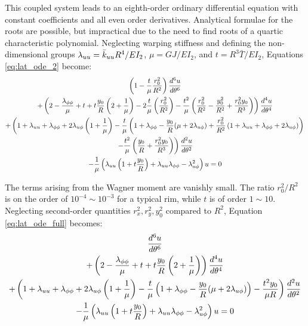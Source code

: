 \documentclass[\rootdir/thesis.tex]{subfiles}
\begin{document}
This coupled system leads to an eighth-order ordinary differential equation with constant coefficients and all even order derivatives. Analytical formulae for the roots are possible, but impractical due to the need to find roots of a quartic characteristic polynomial. Neglecting warping stiffness and defining the non-dimensional groups $\lambda_{uu}=\bar{k}_{uu} R^4/EI_2$, $\mu=GJ/EI_2$, and $t=R^3\bar{T}/EI_2$, Equations \eqref{eq:lat_ode_2} become:
\begin{multline}
\label{eq:lat_ode_full}
  \left(1 - \frac{t}{\mu}\frac{r_0^2}{R^2}\right)\frac{d^6u}{d\theta^6}\\
  +\left(2 - \frac{\lambda_{\phi\phi}}{\mu} + t + t\frac{y_0}{R}\left(2 + \frac{1}{\mu}\right)
         -2\frac{t}{\mu}\left(\frac{r_0^2}{R^2}\right)
         -\frac{t^2}{\mu}\left(\frac{r_0^2}{R^2} - \frac{y_0^2}{R^2} +
                               \frac{r_0^2y_0}{R^3}\right) \right) \frac{d^4u}{d\theta^4}\\
  +\left(1 + \lambda_{uu} + \lambda_{\phi\phi} + 2\lambda_{u\phi}\left(1+\frac{1}{\mu}\right)
         -\frac{t}{\mu}\left(1 + \lambda_{\phi\phi}
                             -\frac{y_0}{R}(\mu + 2\lambda_{u\phi})
                             +\frac{r_0^2}{R^2}\left(1 + \lambda_{uu} + \lambda_{\phi\phi} + 2\lambda_{u\phi}\right)\right)\right.\\
         \left.-\frac{t^2}{\mu}\left(\frac{y_0}{R} + \frac{r_0^2y_0}{R^3}\right)\right)\frac{d^2u}{d\theta^2}\\
  -\frac{1}{\mu}\left(\lambda_{uu}\left(1+t\frac{y_0}{R}\right)
                      +\lambda_{uu}\lambda_{\phi\phi} - \lambda_{u\phi}^2\right)u = 0
\end{multline}

The terms arising from the Wagner moment are vanishly small. The ratio $r_0^2/R^2$ is on the order of $10^{-4}\sim10^{-3}$ for a typical rim, while $t$ is of order $1\sim10$. Neglecting second-order quantities $r_x^2,r_y^2,y_0^2$ compared to $R^2$, Equation \eqref{eq:lat_ode_full} becomes:
\begin{multline}
\label{eq:lat_ode}
  \frac{d^6u}{d\theta^6}\\
  +\left(2 - \frac{\lambda_{\phi\phi}}{\mu} + t + t\frac{y_0}{R}\left(2 + \frac{1}{\mu}\right)
         \right) \frac{d^4u}{d\theta^4}\\
  +\left(1 + \lambda_{uu} + \lambda_{\phi\phi} + 2\lambda_{u\phi}\left(1+\frac{1}{\mu}\right)
         -\frac{t}{\mu}\left(1 + \lambda_{\phi\phi}
                             -\frac{y_0}{R}(\mu + 2\lambda_{u\phi})
                             \right)
         -\frac{t^2y_0}{\mu R}\right)\frac{d^2u}{d\theta^2}\\
  -\frac{1}{\mu}\left(\lambda_{uu}\left(1+t\frac{y_0}{R}\right)
                      +\lambda_{uu}\lambda_{\phi\phi} - \lambda_{u\phi}^2\right)u = 0
\end{multline}
\end{document}

